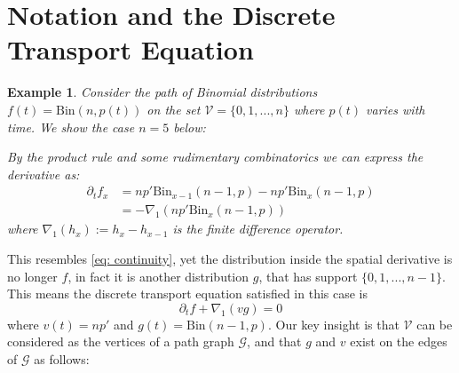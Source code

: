 \documentclass[conference]{IEEEtran}
\newcommand{\GG}{\mathcal{G}}
\newcommand{\VV}{\mathcal{V}}
\newcommand{\bin}{\text{Bin}}
\theoremstyle{ieeestyle}
\newtheorem{exam}{Example}
\begin{document}
\section{Notation and the Discrete Transport Equation}
\begin{exam}\label{examp: bin1}
Consider the path of Binomial distributions $f(t) = \bin(n,p(t))$ on the set $\VV = \{0,1,...,n\}$ where $p(t)$ varies with time. We show the case $n=5$ below:

\begin{center}

\end{center}
By the product rule and some rudimentary combinatorics we can express the derivative as:
\begin{align*}
    \partial_t f_x &= np'\bin_{x-1}(n-1,p) - np'\bin_{x}(n-1,p)\\
    &= -\nabla_1 (np'\bin_x(n-1,p))
\end{align*}
where $\nabla_1(h_x) := h_{x} - h_{x-1}$ is the finite difference operator.
\end{exam}
This resembles \eqref{eq: continuity}, yet the distribution inside the spatial derivative is no longer $f$, in fact it is another distribution $g$, that has support $\{0,1,...,n-1\}$. This means the discrete transport equation satisfied in this case is 
\begin{equation*}
    \partial_t f + \nabla_1 (vg) = 0
\end{equation*}
where $v(t) = np'$ and $g(t) = \bin (n-1,p)$. Our key insight is that $\VV$ can be considered as the vertices of a path graph $\GG$, and that $g$ and $v$ exist on the edges of $\GG$ as follows:
\begin{center}


\end{center}
\end{document}
